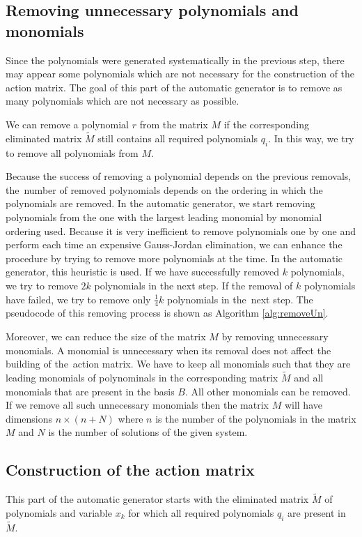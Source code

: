 \subsection{Removing unnecessary polynomials and monomials}
\label{subsec:removingUnPols}
Since the polynomials were generated systematically in the previous step, there may appear some polynomials which are not necessary for the construction of the action matrix. The goal of this part of the automatic generator is to remove as many polynomials which are not necessary as possible.

We can remove a polynomial $r$ from the matrix $M$ if the corresponding eliminated matrix $\tilde{M}$ still contains all required polynomials $q_i$. In this way, we try to remove all polynomials from $M$.

Because the success of removing a polynomial depends on the previous removals, the~number of removed polynomials depends on the ordering in which the polynomials are removed. In the automatic generator, we start removing polynomials from the one with the largest leading monomial by monomial ordering used. Because it is very inefficient to remove polynomials one by one and perform each time an expensive Gauss-Jordan elimination, we can enhance the procedure by trying to remove more polynomials at the time. In the automatic generator, this heuristic is used. If we have successfully removed $k$ polynomials, we try to remove $2k$ polynomials in the next step. If the removal of $k$ polynomials have failed, we try to remove only $\frac{1}{4}k$ polynomials in the~next step. The pseudocode of this removing process is shown as Algorithm \ref{alg:removeUn}.



Moreover, we can reduce the size of the matrix $M$ by removing unnecessary monomials. A monomial is unnecessary when its removal does not affect the building of the~action matrix. We have to keep all monomials such that they are leading monomials of polynominals in the corresponding matrix $\tilde{M}$ and all monomials that are present in the basis $B$. All other monomials can be removed. If we remove all such unnecessary monomials then the matrix $M$ will have dimensions $n \times (n + N)$ where $n$ is the number of the polynomials in the matrix $M$ and $N$ is the number of solutions of the given system.

\subsection{Construction of the action matrix}
This part of the automatic generator starts with the eliminated matrix $\tilde{M}$ of polynomials and variable $x_k$ for which all required polynomials $q_i$ are present in $\tilde{M}$.

